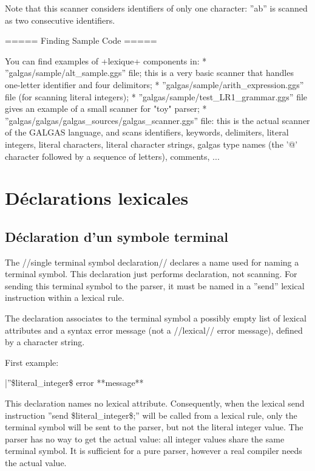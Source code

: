 Note that this scanner considers identifiers of only one character: ''ab'' is scanned as two consecutive identifiers.

===== Finding Sample Code =====

You can find examples of \ggsq+lexique+ components in:
  * ''galgas/sample/alt\_sample.ggs'' file; this is a very basic scanner that handles one-letter identifier and four delimitors;
  * ''galgas/sample/arith\_expression.ggs'' file (for scanning literal integers);
  * ''galgas/sample/test\_LR1\_grammar.ggs'' file gives an example of a small scanner for "toy" parser;
  * ''galgas/galgas/galgas\_sources/galgas\_scanner.ggs'' file: this is the actual scanner of the GALGAS language, and scans identifiers, keywords, delimiters, literal integers, literal characters, literal character strings, galgas type names (the '@' character followed by a sequence of letters), comments, ...

\section{Déclarations lexicales}

\subsection{Déclaration d'un symbole terminal}

The //single terminal symbol declaration// declares a name used for naming a terminal symbol. This declaration just performs declaration, not scanning. For sending this terminal symbol to the parser, it must be named in a ''send'' lexical instruction within a lexical rule.

The declaration associates to the terminal symbol a possibly empty list of lexical attributes and a syntax error message (not a //lexical// error message), defined by a character string.

First example:

|''\$literal\_integer\$ error **message** %

This declaration names no lexical attribute. Consequently, when the lexical send instruction ''send \$literal\_integer\$;'' will be called from a lexical rule, only the terminal symbol will be sent to the parser, but not the literal integer value. The parser has no way to get the actual value: all integer values share the same terminal symbol. It is sufficient for a pure parser, however a real compiler needs the actual value.

